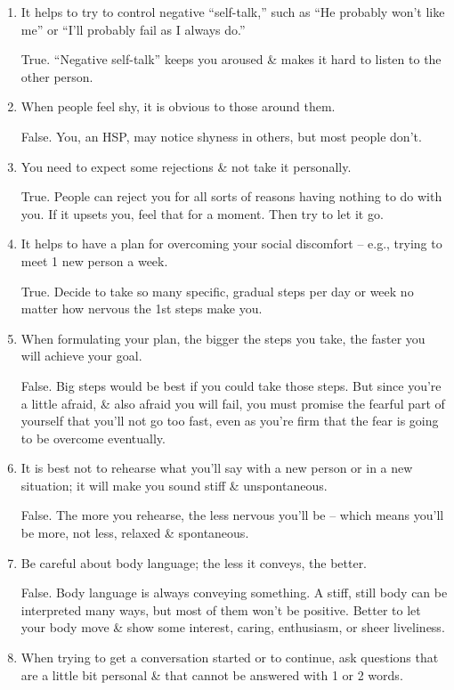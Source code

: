 \documentclass{article}
\numberwithin{equation}{section}
\begin{document}
\begin{enumerate}
	\item It helps to try to control negative ``self-talk,'' such as ``He probably won't like me'' or ``I'll probably fail as I always do.''
	
	True. ``Negative self-talk'' keeps you aroused \& makes it hard to listen to the other person.
	\item When people feel shy, it is obvious to those around them.
	
	False. You, an HSP, may notice shyness in others, but most people don't.
	\item You need to expect some rejections \& not take it personally.
	
	True. People can reject you for all sorts of reasons having nothing to do with you. If it upsets you, feel that for a moment. Then try to let it go.
	\item It helps to have a plan for overcoming your social discomfort -- e.g., trying to meet 1 new person a week.
	
	True. Decide to take so many specific, gradual steps per day or week no matter how nervous the 1st steps make you.
	\item When formulating your plan, the bigger the steps you take, the faster you will achieve your goal.
	
	False. Big steps would be best if you could take those steps. But since you're a little afraid, \& also afraid you will fail, you must promise the fearful part of yourself that you'll not go too fast, even as you're firm that the fear is going to be overcome eventually.
	\item It is best not to rehearse what you'll say with a new person or in a new situation; it will make you sound stiff \& unspontaneous.
	
	False. The more you rehearse, the less nervous you'll be -- which means you'll be more, not less, relaxed \& spontaneous.
	\item Be careful about body language; the less it conveys, the better.
	
	False. Body language is always conveying something. A stiff, still body can be interpreted many ways, but most of them won't be positive. Better to let your body move \& show some interest, caring, enthusiasm, or sheer liveliness.
	\item When trying to get a conversation started or to continue, ask questions that are a little bit personal \& that cannot be answered with 1 or 2 words.
	

\end{enumerate}
\end{document}
